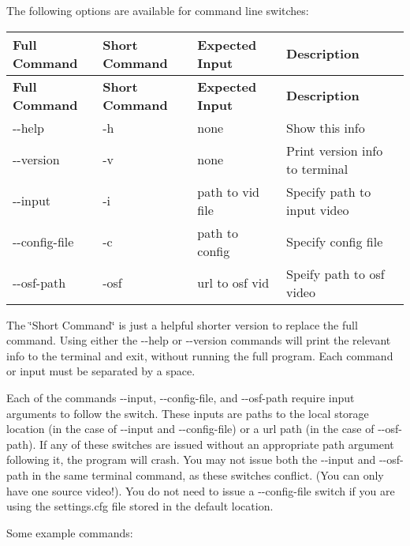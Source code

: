 The following options are available for command line switches\+:

\tabulinesep=1mm
\begin{longtabu} spread 0pt [c]{*{4}{|X[-1]}|}
\hline
\rowcolor{\tableheadbgcolor}\textbf{ Full Command }&\textbf{ Short Command }&\textbf{ Expected Input }&\textbf{ Description  }\\
\endfirsthead
\hline
\endfoot
\hline
\rowcolor{\tableheadbgcolor}\textbf{ Full Command }&\textbf{ Short Command }&\textbf{ Expected Input }&\textbf{ Description  }\\
\endhead
{\ttfamily -\/-\/help} &{\ttfamily -\/h} &none &Show this info \\
{\ttfamily -\/-\/version} &{\ttfamily -\/v} &none &Print version info to terminal \\
{\ttfamily -\/-\/input} &{\ttfamily -\/i} &path to vid file&Specify path to input video \\
{\ttfamily -\/-\/config-\/file}&{\ttfamily -\/c} &path to config &Specify config file \\
{\ttfamily -\/-\/osf-\/path} &{\ttfamily -\/osf} &url to osf vid &Speify path to osf video \\
\end{longtabu}
The \char`\"{}\+Short Command\char`\"{} is just a helpful shorter version to replace the full command. Using either the {\ttfamily -\/-\/help} or {\ttfamily -\/-\/version} commands will print the relevant info to the terminal and exit, without running the full program. Each command or input must be separated by a space.

Each of the commands {\ttfamily -\/-\/input}, {\ttfamily -\/-\/config-\/file}, and {\ttfamily -\/-\/osf-\/path} require input arguments to follow the switch. These inputs are paths to the local storage location (in the case of {\ttfamily -\/-\/input} and {\ttfamily -\/-\/config-\/file}) or a url path (in the case of {\ttfamily -\/-\/osf-\/path}). If any of these switches are issued without an appropriate path argument following it, the program will crash. You may not issue both the {\ttfamily -\/-\/input} and {\ttfamily -\/-\/osf-\/path} in the same terminal command, as these switches conflict. (You can only have one source video!). You do not need to issue a {\ttfamily -\/-\/config-\/file} switch if you are using the {\ttfamily settings.\+cfg} file stored in the default location.

Some example commands\+:


